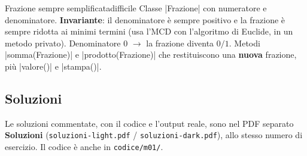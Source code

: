 \begin{esercizio}{Frazione sempre semplificata}{difficile}
Classe \cc|Frazione| con numeratore e denominatore. \textbf{Invariante}: il
denominatore è sempre positivo e la frazione è sempre ridotta ai minimi termini
(usa l'MCD con l'algoritmo di Euclide, in un metodo privato). Denominatore 0
$\to$ la frazione diventa $0/1$. Metodi \cc|somma(Frazione)| e
\cc|prodotto(Frazione)| che restituiscono una \textbf{nuova} frazione, più
\cc|valore()| e \cc|stampa()|.
\end{esercizio}

\subsection*{Soluzioni}
Le soluzioni commentate, con il codice e l'output reale, sono nel PDF separato
\textbf{Soluzioni} (\texttt{soluzioni-light.pdf} / \texttt{soluzioni-dark.pdf}),
allo stesso numero di esercizio. Il codice è anche in \texttt{codice/m01/}.
